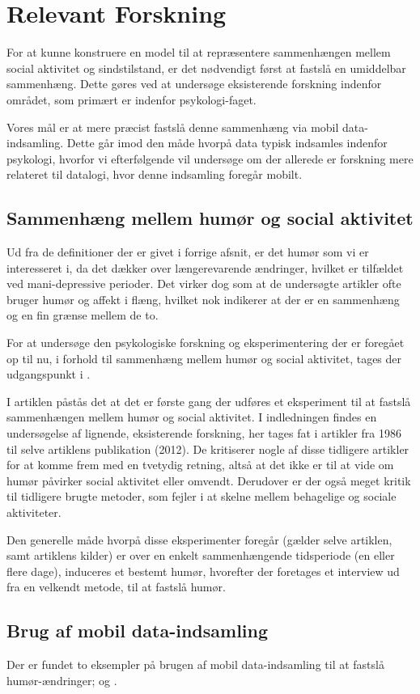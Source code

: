 

\section{Relevant Forskning}
For at kunne konstruere en model til at repræsentere sammenhængen mellem social aktivitet og sindstilstand, er det nødvendigt først at fastslå en umiddelbar sammenhæng.
Dette gøres ved at undersøge eksisterende forskning indenfor området, som primært er indenfor psykologi-faget.

Vores mål er at mere præcist fastslå denne sammenhæng via mobil data-indsamling.
Dette går imod den måde hvorpå data typisk indsamles indenfor psykologi, hvorfor vi efterfølgende vil undersøge om der allerede er forskning mere relateret til datalogi, hvor denne indsamling foregår mobilt.

\subsection{Sammenhæng mellem humør og social aktivitet}
Ud fra de definitioner der er givet i forrige afsnit, er det humør som vi er interesseret i, da det dækker over længerevarende ændringer, hvilket er tilfældet ved mani-depressive perioder.
Det virker dog som at de undersøgte artikler ofte bruger humør og affekt i flæng, hvilket nok indikerer at der er en sammenhæng og en fin grænse mellem de to.

For at undersøge den psykologiske forskning og eksperimentering der er foregået op til nu, i forhold til sammenhæng mellem humør og social aktivitet, tages der udgangspunkt i \citet{whelan}.

I artiklen påstås det at det er første gang der udføres et eksperiment til at fastslå sammenhængen mellem humør og social aktivitet.
I indledningen findes en undersøgelse af lignende, eksisterende forskning, her tages fat i artikler fra 1986 til selve artiklens publikation (2012).
De kritiserer nogle af disse tidligere artikler for at komme frem med en tvetydig retning, altså at det ikke er til at vide om humør påvirker social aktivitet eller omvendt.
Derudover er der også meget kritik til tidligere brugte metoder, som fejler i at skelne mellem behagelige og sociale aktiviteter.

Den generelle måde hvorpå disse eksperimenter foregår (gælder selve artiklen, samt artiklens kilder) er over en enkelt sammenhængende tidsperiode (en eller flere dage), induceres et bestemt humør, hvorefter der foretages et interview ud fra en velkendt metode, til at fastslå humør.


\subsection{Brug af mobil data-indsamling}
Der er fundet to eksempler på brugen af mobil data-indsamling til at fastslå humør-ændringer; \citet{social_sensing} og \citet{social_sensing_2}.
